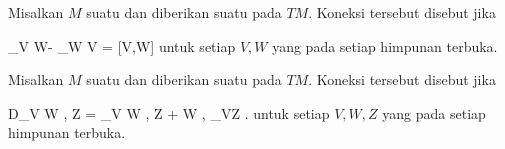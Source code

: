 {}
{

Misalkan $M$ suatu
dan diberikan suatu
pada
$TM$. Koneksi tersebut disebut
jika

\mavergleichskettedisp
{\vergleichskette
{ \nabla_V W- \nabla_W V
}
{ =} { [V,W]
}
{ } {
}
{ } {
}
{ } {
}
}
{}{}{}
untuk setiap
$V,W$ yang
pada setiap himpunan terbuka.

}

{}
{

Misalkan $M$ suatu
dan diberikan suatu
pada
$TM$. Koneksi tersebut disebut
jika

\mavergleichskettedisp
{\vergleichskette
{ D_V \left\langle  W  ,  Z  \right\rangle
}
{ =} { \left\langle \nabla_V W , Z  \right\rangle  + \left\langle  W  ,  \nabla_VZ  \right\rangle
}
{ } {
}
{ } {
}
{ } {
}
}
{}{}{.}
untuk setiap
$V,W,Z$ yang
pada setiap himpunan terbuka.

}



